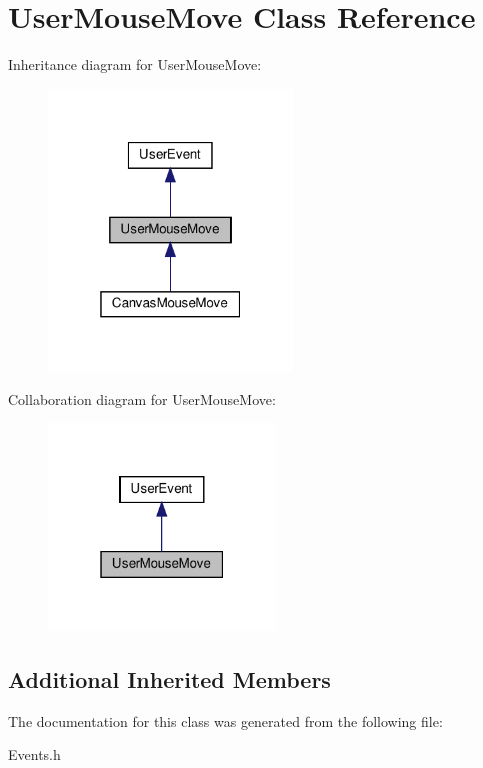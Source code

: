 \hypertarget{classUserMouseMove}{}\section{User\+Mouse\+Move Class Reference}
\label{classUserMouseMove}


Inheritance diagram for User\+Mouse\+Move\+:\nopagebreak
\begin{figure}[H]
\begin{center}
\leavevmode
\includegraphics[width=184pt]{classUserMouseMove__inherit__graph}
\end{center}
\end{figure}


Collaboration diagram for User\+Mouse\+Move\+:\nopagebreak
\begin{figure}[H]
\begin{center}
\leavevmode
\includegraphics[width=171pt]{classUserMouseMove__coll__graph}
\end{center}
\end{figure}
\subsection*{Additional Inherited Members}


The documentation for this class was generated from the following file\+:\begin{DoxyCompactItemize}
\item 
Events.\+h\end{DoxyCompactItemize}
